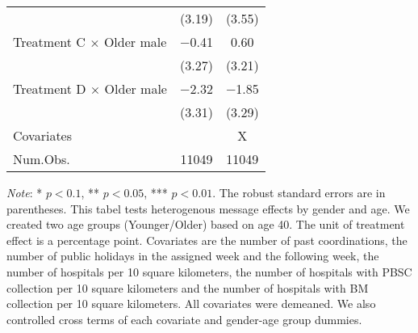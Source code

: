 \documentclass[12pt, a4paper]{article}
\begin{document}
\begin{table}[H]
\begin{threeparttable}
\begin{tabular}[t]{lcc}
 & (\num{3.19}) & (\num{3.55})\\
Treatment C $\times$ Older male & \num{-0.41} & \num{0.60}\\
 & (\num{3.27}) & (\num{3.21})\\
Treatment D $\times$ Older male & \num{-2.32} & \num{-1.85}\\
 & (\num{3.31}) & (\num{3.29})\\
\midrule
Covariates &  & X\\
Num.Obs. & \num{11049} & \num{11049}\\
\bottomrule
\end{tabular}
\begin{tablenotes}
\item \emph{Note}: * $p < 0.1$, ** $p < 0.05$, *** $p < 0.01$. The robust standard errors are in parentheses. This tabel tests heterogenous message effects by gender and age. We created two age groups (Younger/Older) based on age 40. The unit of treatment effect is a percentage point. Covariates are the number of past coordinations, the number of public holidays in the assigned week and the following week, the number of hospitals per 10 square kilometers, the number of hospitals with PBSC collection per 10 square kilometers and the number of hospitals with BM collection per 10 square kilometers. All covariates were demeaned. We also controlled cross terms of each covariate and gender-age group dummies.
\end{tablenotes}
\end{threeparttable}
\end{table}
\end{document}
